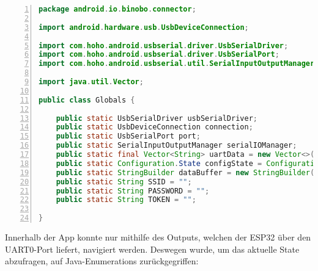 \documentclass[paper=a4,12pt]{scrreprt}
\begin{document}
\begin{lstlisting}[caption={Globale Variablen}, captionpos=b, label={listing:android_globals}, language=java, numbers=left,
  stepnumber=1]
package android.io.binobo.connector;

import android.hardware.usb.UsbDeviceConnection;

import com.hoho.android.usbserial.driver.UsbSerialDriver;
import com.hoho.android.usbserial.driver.UsbSerialPort;
import com.hoho.android.usbserial.util.SerialInputOutputManager;

import java.util.Vector;

public class Globals {

    public static UsbSerialDriver usbSerialDriver;
    public static UsbDeviceConnection connection;
    public static UsbSerialPort port;
    public static SerialInputOutputManager serialIOManager;
    public static final Vector<String> uartData = new Vector<>();
    public static Configuration.State configState = Configuration.State.UNKNOWN_STATE;
    public static StringBuilder dataBuffer = new StringBuilder();
    public static String SSID = "";
    public static String PASSWORD = "";
    public static String TOKEN = "";
  
}
\end{lstlisting}


Innerhalb der App konnte nur mithilfe des Outputs, welchen der ESP32 über den UART0-Port liefert, navigiert werden. Deswegen wurde, um das aktuelle State abzufragen,
auf Java-Enumerations zurückgegriffen:\newline
\end{document}
